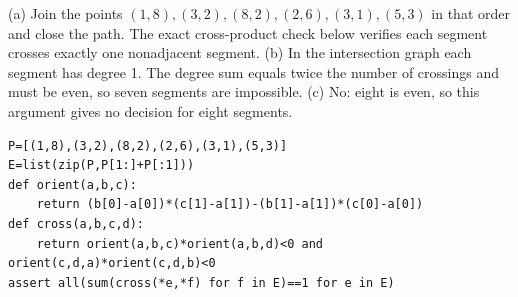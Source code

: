 (a) Join the points $(1,8),(3,2),(8,2),(2,6),(3,1),(5,3)$ in that order and close the path. The exact cross-product check below verifies each segment crosses exactly one nonadjacent segment. (b) In the intersection graph each segment has degree 1. The degree sum equals twice the number of crossings and must be even, so seven segments are impossible. (c) No: eight is even, so this argument gives no decision for eight segments.
\begin{verbatim}
P=[(1,8),(3,2),(8,2),(2,6),(3,1),(5,3)]
E=list(zip(P,P[1:]+P[:1]))
def orient(a,b,c):
    return (b[0]-a[0])*(c[1]-a[1])-(b[1]-a[1])*(c[0]-a[0])
def cross(a,b,c,d):
    return orient(a,b,c)*orient(a,b,d)<0 and orient(c,d,a)*orient(c,d,b)<0
assert all(sum(cross(*e,*f) for f in E)==1 for e in E)
\end{verbatim}
